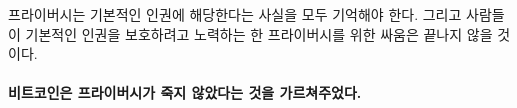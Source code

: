 \begin{comment}
We should all remember that privacy is a fundamental human right\footnote{Universal Declaration of Human Rights, \textit{Article 12}.~\cite{article12}}. And as long
as people exercise and defend these rights the battle for privacy is far from
over.
\end{comment}
프라이버시는 기본적인 인권에 해당한다는 사실을 모두 기억해야 한다\cite{article12}.
그리고 사람들이 기본적인 인권을 보호하려고 노력하는 한 프라이버시를 위한 싸움은 끝나지 않을 것이다.

\paragraph{비트코인은 프라이버시가 죽지 않았다는 것을 가르쳐주었다.}

%
%
%
%
